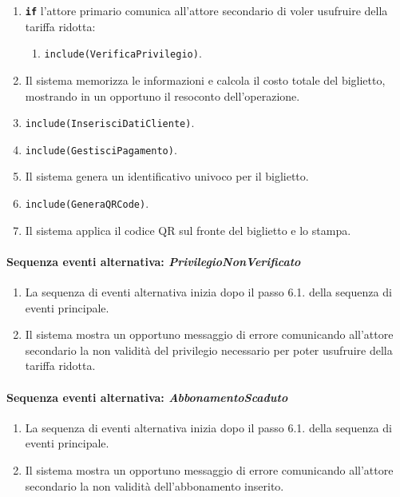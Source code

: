 \documentclass{article}
\begin{document}
\begin{enumerate}[itemsep=5pt,parsep=0pt]
		\item \texttt{\textbf{if}} l'attore primario comunica all'attore secondario di voler usufruire della tariffa ridotta:
			\begin{enumerate}[leftmargin=34pt]
				\item  \texttt{{include(VerificaPrivilegio)}}.
			\end{enumerate}

		\item Il sistema memorizza le informazioni e calcola il costo totale del biglietto, mostrando in un opportuno il resoconto dell'operazione.

		\item  \texttt{{include(InserisciDatiCliente)}}.

		\item  \texttt{{include(GestisciPagamento)}}.

		\item Il sistema genera un identificativo univoco per il biglietto.

		\item  \texttt{{include(GeneraQRCode)}}.

		\item Il sistema applica il codice QR sul fronte del biglietto e lo stampa.
	\end{enumerate}
	
	\paragraph{Sequenza eventi alternativa: \emph{PrivilegioNonVerificato}}
		\begin{enumerate}[itemsep=8pt,parsep=0pt]
				\item La sequenza di eventi alternativa inizia dopo il passo 6.1. della sequenza di eventi principale.
				\item Il sistema mostra un opportuno messaggio di errore comunicando all'attore secondario la non validità del privilegio necessario per poter usufruire della tariffa ridotta.
		\end{enumerate}

	\paragraph{Sequenza eventi alternativa: \emph{AbbonamentoScaduto}}
		\begin{enumerate}[itemsep=8pt,parsep=0pt]
				\item La sequenza di eventi alternativa inizia dopo il passo 6.1. della sequenza di eventi principale.
				\item Il sistema mostra un opportuno messaggio di errore comunicando all'attore secondario la non validità dell'abbonamento inserito.
		\end{enumerate}
\end{document}
